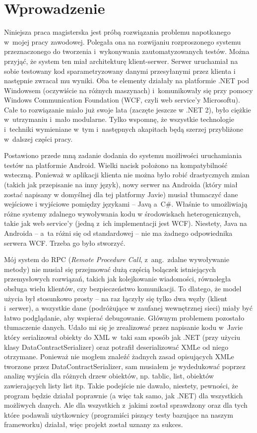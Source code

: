 \chapter{Wprowadzenie}
\label{intro}
Niniejsza praca magisterska jest próbą rozwiązania problemu napotkanego w~mojej pracy zawodowej. Polegała ona na rozwijaniu rozproszonego systemu przeznaczonego do tworzenia i~wykonywania zautomatyzowanych testów. Można przyjąć, że system ten miał architekturę klient-serwer. Serwer uruchamiał na sobie testowany kod sparametryzowany danymi przesyłanymi przez klienta i następnie zwracał mu wyniki. Oba te elementy działały na platformie .NET pod Windowsem (oczywiście na różnych maszynach) i~komunikowały się przy pomocy Windows Communication Foundation (WCF, czyli web service'y Microsoftu). Całe to rozwiązanie miało już swoje lata (zaczęte jeszcze w .NET 2), było ciężkie w~utrzymaniu i~mało modularne. Tylko wspomnę, że wszystkie technologie i~techniki wymieniane w~tym i~następnych akapitach będą szerzej przybliżone w~dalszej części pracy.

Postawiono przede mną zadanie dodania do systemu możliwości uruchamiania testów na platformie Android. Wielki nacisk położono na kompatybilność wsteczną. Ponieważ w aplikacji klienta nie można było robić drastycznych zmian (takich jak przepisanie na inny język), nowy serwer na Androida (który miał zostać napisany w domyślnej dla tej platformy Javie) musiał tłumaczyć dane wejściowe i wyjściowe pomiędzy językami -- Javą a~C\#.  Właśnie to umożliwiają różne systemy zdalnego wywoływania kodu w środowiskach heterogenicznych, takie jak web service'y (jedną z~ich implementacji jest WCF). Niestety, Java na Androida -- a~ta różni się od standardowej -- nie ma żadnego odpowiednika serwera WCF. Trzeba go było stworzyć.

Mój system do RPC (\emph{Remote Procedure Call}, z~ang.\ zdalne wywoływanie metody) nie musiał się przejmować dużą częścią bolączek istniejących przemysłowych rozwiązań, takich jak kolejkowanie wiadomości, równoległa obsługa wielu klientów, czy bezpieczeństwo komunikacji. To dlatego, że model użycia był stosunkowo prosty -- na raz łączyły się tylko dwa węzły (klient i~serwer), a wszystkie dane (podróżujące w zaufanej wewnętrznej sieci) miały być łatwo podglądanie, aby wspierać debugowanie. Głównym problemem pozostało tłumaczenie danych. Udało mi się je zrealizować przez napisanie kodu w~Javie który serializował obiekty do XML w~taki sam sposób jak .NET (przy użyciu klasy DataContractSerializer) oraz potrafił deserializować XMLe od niego otrzymane. Ponieważ nie mogłem znaleźć żadnych zasad opisujących XMLe tworzone przez DataContractSerializer, sam musiałem je wydedukować poprzez analizę wyjścia dla różnych drzew obiektów, np. tablic, list, obiektów zawierających listy list itp. Takie podejście nie dawało, niestety, pewności, że program będzie działał poprawnie (a więc tak samo, jak .NET) dla wszystkich możliwych danych. Ale dla wszystkich z~jakimi został sprawdzony oraz dla tych które podawali użytkownicy (programiści piszący testy bazujące na naszym frameworku) działał, więc projekt został uznany za sukces.

